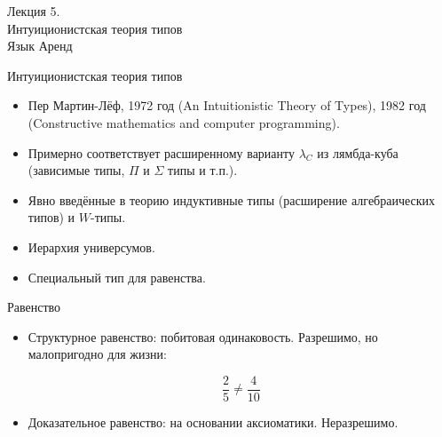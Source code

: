 \documentclass[aspectratio=169,dvipsnames,usenames]{beamer}
\begin{document}
\newtheorem{dfn}{Определение}[section]
\newtheorem{nte}{Замечание}[section]

\newtheorem{axiom}{Аксиома}[section]
\newtheorem{thm}{Теорема}[section]
\newtheorem{lmm}[theorem]{Лемма}
\newtheorem{statement}{Утверждение}[section]
\newtheorem{oun_paragraph}{Пункт}[section]
\newtheorem{cons}{Следствие}[section]
\newtheorem*{exm}{Пример}

\newcommand{\comb}[1]{\operatorname{\bf{\textrm{#1}}}}
\newcommand{\func}[1]{\operatorname{#1}}
\newcommand{\reduction}[1]{{\color{OrangeRed}#1}}
\newcommand{\set}[1]{\left\{#1\right\}}

\def\from#1{\par \parbox{0.7\textwidth}{\par \hfill\raggedleft \it #1}} 

\begin{frame}{}
\begin{center}\Large Лекция 5. \\Интуиционистская теория типов\\Язык Аренд\end{center}
\end{frame}

\begin{frame}{Интуиционистская теория типов}
\begin{itemize}
\item Пер Мартин-Лёф, 1972 год (An Intuitionistic Theory of Types), 
1982 год (Constructive mathematics and computer programming).
\item Примерно соответствует расширенному варианту $\lambda_C$ из лямбда-куба
(зависимые типы, $\Pi$ и $\Sigma$ типы и т.п.).
\item Явно введённые в теорию индуктивные типы (расширение алгебраических типов) и $W$-типы.
\item Иерархия универсумов.
\item Специальный тип для равенства.
\end{itemize}
\end{frame}

\begin{frame}{Равенство}

\begin{itemize}
\item Структурное равенство: побитовая одинаковость.
Разрешимо, но малопригодно для жизни:

$$\frac{2}{5} \ne \frac{4}{10}$$\vspace{0.5cm}

\item Доказательное равенство: на основании аксиоматики. Неразрешимо.
\end{itemize}
\end{frame}
\end{document}
